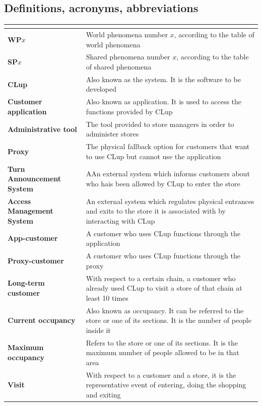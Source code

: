 \documentclass[a4paper,oneside,11pt]{book}   %
\begin{document}
    \subsection{Definitions, acronyms, abbreviations}
    \begin{longtable}[c] { |>{\bfseries{}}C{0.25\textwidth}|V{0.55\textwidth}| }
        \hline
         \\
        \hline
        WP\boldmath$x$ & World phenomena number $x$, according to the table of world phenomena \\ \hline
        SP\boldmath$x$ & Shared phenomena number $x$, according to the table of shared phenomena \\ \hline
        CLup & Also known as the system. It is the software to be developed \\ \hline
        Customer application & Also known as application. It is used to access the functions provided by CLup \\ \hline
        Administrative tool & The tool provided to store managers in order to administer stores \\ \hline
        Proxy & The physical fallback option for customers that want to use CLup but cannot use the application \\ \hline
        Turn Announcement System & AAn external system which informs customers about who hais been allowed by CLup to enter the store \\ \hline
        Access Management System & An external system which regulates physical entrances and exits to the store it is associated with by interacting with CLup \\ \hline
        App-customer & A customer who uses CLup functions through the application \\ \hline
        Proxy-customer & A customer who uses CLup functions through the proxy \\ \hline
        Long-term customer & With respect to a certain chain, a customer who already used CLup to visit a store of that chain at least 10 times \\ \hline
        Current occupancy & Also known as occupancy. It can be referred to the store or one of its sections. It is the number of people inside it \\ \hline
        Maximum occupancy & Refers to the store or one of its sections. It is the maximum number of people allowed to be in that area \\ \hline
        Visit & With respect to a customer and a store, it is the representative event of entering, doing the shopping and exiting \\ \hline

\end{longtable}
\end{document}
